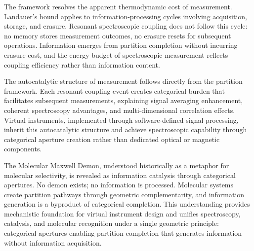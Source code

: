 \documentclass[twocolumn,10pt,a4paper]{article}
\theoremstyle{definition}
\theoremstyle{remark}
\begin{document}
The framework resolves the apparent thermodynamic cost of measurement. Landauer's bound applies to information-processing cycles involving acquisition, storage, and erasure. Resonant spectroscopic coupling does not follow this cycle: no memory stores measurement outcomes, no erasure resets for subsequent operations. Information emerges from partition completion without incurring erasure cost, and the energy budget of spectroscopic measurement reflects coupling efficiency rather than information content.

The autocatalytic structure of measurement follows directly from the partition framework. Each resonant coupling event creates categorical burden that facilitates subsequent measurements, explaining signal averaging enhancement, coherent spectroscopy advantages, and multi-dimensional correlation effects. Virtual instruments, implemented through software-defined signal processing, inherit this autocatalytic structure and achieve spectroscopic capability through categorical aperture creation rather than dedicated optical or magnetic components.

The Molecular Maxwell Demon, understood historically as a metaphor for molecular selectivity, is revealed as information catalysis through categorical apertures. No demon exists; no information is processed. Molecular systems create partition pathways through geometric complementarity, and information generation is a byproduct of categorical completion. This understanding provides mechanistic foundation for virtual instrument design and unifies spectroscopy, catalysis, and molecular recognition under a single geometric principle: categorical apertures enabling partition completion that generates information without information acquisition.




\end{document}
